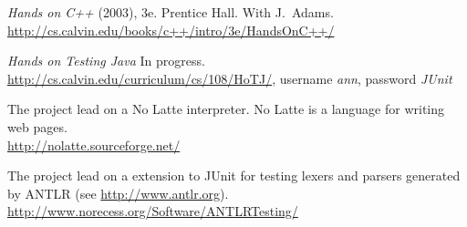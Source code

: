 \documentclass[ComputerScience]{vita}
\newcommand{\duphref}[1]{\href{#1}{#1}}
\begin{document}
\begin{vita}
\begin{Publications}

  \begin{Books}

  \item \textit{Hands on C++} (2003), 3e.  Prentice Hall.  With J.\ Adams.  \\\duphref{http://cs.calvin.edu/books/c++/intro/3e/HandsOnC++/}

  \item \textit{Hands on Testing Java} In progress.  \\\duphref{http://cs.calvin.edu/curriculum/cs/108/HoTJ/}, username \emph{ann}, password \emph{JUnit}

  \end{Books}

\end{Publications}


\begin{software}
	\item The project lead on a No Latte interpreter.  No Latte is a language for writing web pages.  \\\duphref{http://nolatte.sourceforge.net/}
  \item The project lead on a extension to JUnit for testing lexers and parsers generated by ANTLR (see \duphref{http://www.antlr.org}).  \\\duphref{http://www.norecess.org/Software/ANTLRTesting/}
\end{software}








\end{vita}
\end{document}
